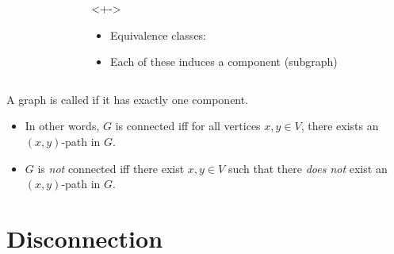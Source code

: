 \documentclass
[ignorenonframetext,14pt,aspectratio=169]
{ngelessonslides}
\begin{document}
\begin{frame}[label=cpt-ex]
\begin{columns}
\begin{column}{0.45\textwidth}
\begin{example}
        \end{example}
    \end{column}
    \begin{column}{0.45\textwidth}
        \begin{solution}<+->
            \begin{itemize}
            \item<+-> Equivalence classes:
            \item<+-> Each of these induces a component (subgraph)
            \end{itemize}
        \end{solution}
    \end{column}
    \end{columns}
\end{frame}

\begin{frame}[label=ctd-def]
\begin{definition}[Connected]
    A graph is called  if it has exactly one component.
\end{definition}
\begin{itemize}
    \item In other words, $G$ is connected iff for all vertices $x,y\in V$,
    there exists an $(x,y)$-path in $G$.
    \item $G$ is \emph{not} connected iff there exist $x,y\in V$ such that
    there \emph{does not} exist an $(x,y)$-path in $G$.
\end{itemize}
\end{frame}

\section{Disconnection}
\end{document}

